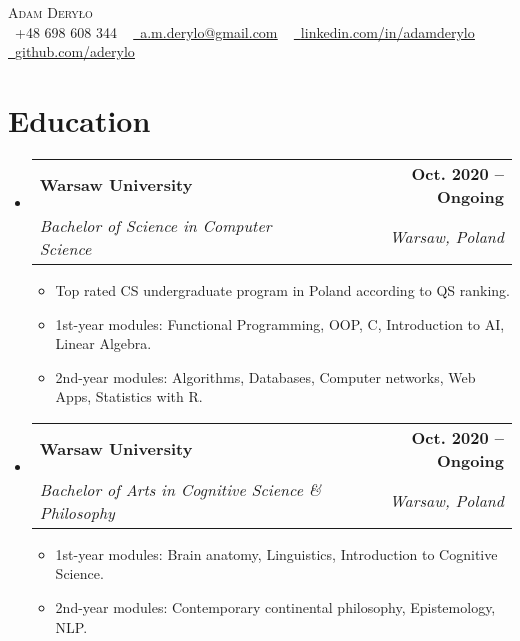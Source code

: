 \documentclass[letterpaper,11pt]{article}
\makeatletter
\newcommand{\resumeItem}[1]{
  \item\small{
    {#1 \vspace{-2pt}}
  }
}
\newcommand{\resumeSubheading}[4]{
  \vspace{-2pt}\item
    \begin{tabular*}{1.0\textwidth}[t]{l@{\extracolsep{\fill}}r}
      \textbf{#1} & \textbf{\small #2} \\
      \textit{\small#3} & \textit{\small #4} \\
    \end{tabular*}\vspace{-7pt}
}
\newcommand{\resumeSubHeadingListStart}{\begin{itemize}[leftmargin=0.0in, label={}]}
\newcommand{\resumeSubHeadingListEnd}{\end{itemize}}
\newcommand{\resumeItemListStart}{\begin{itemize}}
\newcommand{\resumeItemListEnd}{\end{itemize}\vspace{-5pt}}
\makeatother
\begin{document}

\begin{center}
    {\Huge \scshape Adam Deryło} \\ \vspace{4pt}
    \small \raisebox{-0.1\height}\faPhone\ +48 698 608 344 ~ \href{mailto:a.m.derylo@gmail.com}{\raisebox{-0.2\height}\faEnvelope\  \underline{a.m.derylo@gmail.com}} ~ 
    \href{https://linkedin.com/in//adamderylo}{\raisebox{-0.2\height}\faLinkedin\ \underline{linkedin.com/in/adamderylo}}  ~
    \href{https://github.com/aderylo}{\raisebox{-0.2\height}\faGithub\ \underline{github.com/aderylo}}
\end{center}


\section{Education}
  \resumeSubHeadingListStart
    \resumeSubheading
      {Warsaw University}{Oct. 2020 -- Ongoing}
      {Bachelor of Science in Computer Science}{Warsaw, Poland}
      \resumeItemListStart
        \resumeItem{Top rated CS undergraduate program in Poland according to QS ranking.}
        \resumeItem{1st-year modules: Functional Programming, OOP, C, Introduction to AI, Linear Algebra.}
        \resumeItem{2nd-year modules: Algorithms, Databases, Computer networks, Web Apps, Statistics with R.}
      \resumeItemListEnd
  
    \resumeSubheading
      {Warsaw University}{Oct. 2020 -- Ongoing}
      {Bachelor of Arts in Cognitive Science \& Philosophy}{Warsaw, Poland}
      \resumeItemListStart
        \resumeItem{1st-year modules:  Brain anatomy, Linguistics, Introduction to Cognitive Science.}
        \resumeItem{2nd-year modules: Contemporary continental philosophy, Epistemology, NLP.}
    \resumeItemListEnd
  \resumeSubHeadingListEnd
  \vspace{-16pt}
\end{document}
